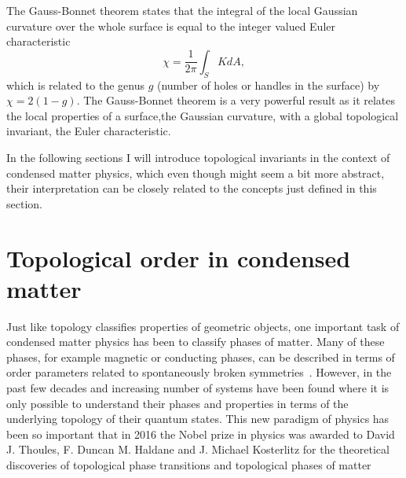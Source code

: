 The Gauss-Bonnet theorem states that the integral of the local Gaussian curvature over the whole surface is equal to the integer valued Euler characteristic
%
\begin{equation}
	\chi = \frac{1}{2\pi}\int_S K dA,
	\label{eq:euler_characteristic}
\end{equation}
%
which is related to the genus $g$ (number of holes or handles in the surface) by $\chi=2(1-g)$. The Gauss-Bonnet theorem is a very powerful result as it relates the local properties of a surface,the Gaussian curvature, with a global topological invariant, the Euler characteristic.

In the following sections I will introduce topological invariants in the context of condensed matter physics, which even though might seem a bit more abstract, their interpretation can be closely related to the concepts just defined in this section. 
\section{Topological order in condensed matter}

Just like topology classifies properties of geometric objects, one important task of condensed matter physics has been to classify phases of matter. Many of these phases, for example magnetic or conducting phases, can be described in terms of order parameters related to spontaneously broken symmetries~\cite{landau_theory_1936}. However, in the past few decades and increasing number of systems have been found where it is only possible to understand their phases and properties in terms of the underlying topology of their quantum states. This new paradigm of physics has been so important that in 2016 the Nobel prize in physics was awarded to David J. Thoules, F. Duncan M. Haldane and J. Michael Kosterlitz for the theoretical discoveries of topological phase transitions and topological phases of matter 

